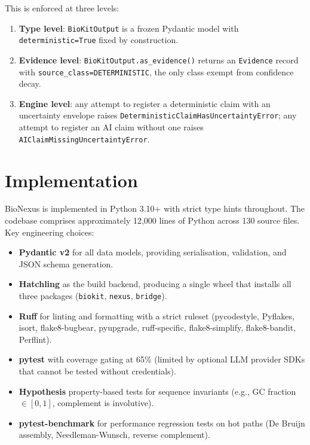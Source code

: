 \documentclass[11pt,a4paper]{article}
\begin{document}
This is enforced at three levels:

\begin{enumerate}
  \item \textbf{Type level}: \texttt{BioKitOutput} is a frozen Pydantic
        model with \texttt{deterministic=True} fixed by construction.
  \item \textbf{Evidence level}: \texttt{BioKitOutput.as\_evidence()}
        returns an \texttt{Evidence} record with
        \texttt{source\_class=DETERMINISTIC}, the only class exempt from
        confidence decay.
  \item \textbf{Engine level}: any attempt to register a deterministic
        claim with an uncertainty envelope raises
        \texttt{DeterministicClaimHasUncertaintyError}; any attempt to
        register an AI claim without one raises
        \texttt{AIClaimMissingUncertaintyError}.
\end{enumerate}

\section{Implementation}

BioNexus is implemented in Python 3.10+ with strict type hints throughout.
The codebase comprises approximately 12,000 lines of Python across 130
source files. Key engineering choices:

\begin{itemize}
  \item \textbf{Pydantic v2} for all data models, providing serialisation,
        validation, and JSON schema generation.
  \item \textbf{Hatchling} as the build backend, producing a single wheel
        that installs all three packages (\texttt{biokit},
        \texttt{nexus}, \texttt{bridge}).
  \item \textbf{Ruff} for linting and formatting with a strict ruleset
        (pycodestyle, Pyflakes, isort, flake8-bugbear, pyupgrade,
        ruff-specific, flake8-simplify, flake8-bandit, Perflint).
  \item \textbf{pytest} with coverage gating at 65\% (limited by optional
        LLM provider SDKs that cannot be tested without credentials).
  \item \textbf{Hypothesis} property-based tests for sequence invariants
        (e.g., GC fraction $\in [0,1]$, complement is involutive).
  \item \textbf{pytest-benchmark} for performance regression tests on
        hot paths (De Bruijn assembly, Needleman-Wunsch, reverse
        complement).
\end{itemize}
\end{document}
